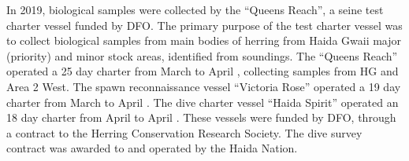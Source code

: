 In 2019, biological samples were collected by the ``Queens Reach'', a seine test charter vessel funded by DFO.
The primary purpose of the test charter vessel was to collect biological samples from main bodies of herring from Haida Gwaii major (priority) and minor stock areas, identified from soundings.
The ``Queens Reach'' operated a 25 day charter from March  to April , collecting samples from HG and Area 2 West.
The spawn reconnaissance vessel ``Victoria Rose'' operated a 19 day charter from March  to April .
The dive charter vessel ``Haida Spirit'' operated an 18 day charter from April  to April .
These vessels were funded by DFO, through a contract to the Herring Conservation Research Society.
The dive survey contract was awarded to and operated by the Haida Nation.